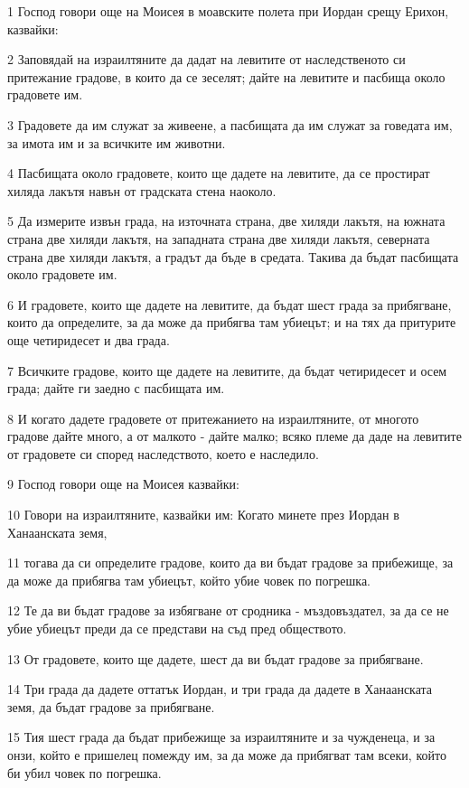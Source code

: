 \par 1 Господ говори още на Моисея в моавските полета при Иордан срещу Ерихон, казвайки:
\par 2 Заповядай на израилтяните да дадат на левитите от наследственото си притежание градове, в които да се зеселят; дайте на левитите и пасбища около градовете им.
\par 3 Градовете да им служат за живеене, а пасбищата да им служат за говедата им, за имота им и за всичките им животни.
\par 4 Пасбищата около градовете, които ще дадете на левитите, да се простират хиляда лакътя навън от градската стена наоколо.
\par 5 Да измерите извън града, на източната страна, две хиляди лакътя, на южната страна две хиляди лакътя, на западната страна две хиляди лакътя, северната страна две хиляди лакътя, а градът да бъде в средата. Такива да бъдат пасбищата около градовете им.
\par 6 И градовете, които ще дадете на левитите, да бъдат шест града за прибягване, които да определите, за да може да прибягва там убиецът; и на тях да притурите още четиридесет и два града.
\par 7 Всичките градове, които ще дадете на левитите, да бъдат четиридесет и осем града; дайте ги заедно с пасбищата им.
\par 8 И когато дадете градовете от притежанието на израилтяните, от многото градове дайте много, а от малкото - дайте малко; всяко племе да даде на левитите от градовете си според наследството, което е наследило.
\par 9 Господ говори още на Моисея казвайки:
\par 10 Говори на израилтяните, казвайки им: Когато минете през Иордан в Ханаанската земя,
\par 11 тогава да си определите градове, които да ви бъдат градове за прибежище, за да може да прибягва там убиецът, който убие човек по погрешка.
\par 12 Те да ви бъдат градове за избягване от сродника - мъздовъздател, за да се не убие убиецът преди да се представи на съд пред обществото.
\par 13 От градовете, които ще дадете, шест да ви бъдат градове за прибягване.
\par 14 Три града да дадете оттатък Иордан, и три града да дадете в Ханаанската земя, да бъдат градове за прибягване.
\par 15 Тия шест града да бъдат прибежище за израилтяните и за чужденеца, и за онзи, който е пришелец помежду им, за да може да прибягват там всеки, който би убил човек по погрешка.
